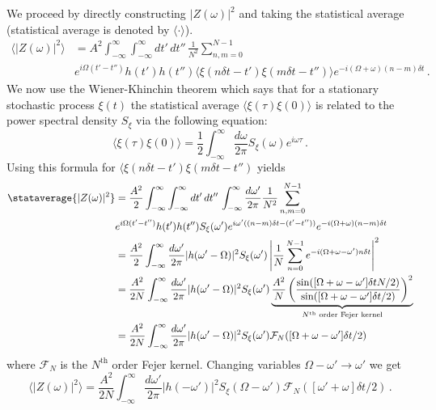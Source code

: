 We proceed by directly constructing $|Z(\omega)|^2$ and taking the statistical average (statistical average is denoted by $\langle \cdot \rangle$).
\begin{align}
\langle \left| Z(\omega) \right| ^2 \rangle
&= A^2 \int_{-\infty}^\infty \int_{-\infty}^\infty dt' \, dt'' \, \frac{1}{N^2} \sum_{n,m=0}^{N-1} \nonumber \\
& e^{i\Omega (t' - t'')} h(t') h(t'') \langle \xi(n\delta t - t') \xi(m\delta t - t'') \rangle e^{-i(\Omega + \omega)(n - m)\delta t} \, .
\end{align}
We now use the Wiener-Khinchin theorem which says that for a stationary stochastic process $\xi(t)$ the statistical average $\langle \xi(\tau) \xi(0) \rangle$  is related to the power spectral density $S_\xi$ via the following equation:
\begin{equation}
\langle \xi(\tau) \xi(0) \rangle = \frac{1}{2}\int_{-\infty}^\infty \frac{d\omega}{2\pi} S_\xi(\omega) e^{i \omega \tau} \, .
\end{equation}
Using this formula for $\langle \xi(n\delta t - t') \xi(m\delta t - t'')$ yields
\begin{align}
\stataverage{|Z(\omega)|^2}
&= \frac{A^2}{2} \int_{-\infty}^\infty \int_{-\infty}^\infty dt' \, dt'' \, \int_{-\infty}^\infty \frac{d\omega'}{2\pi}\frac{1}{N^2} \sum_{n,m=0}^{N-1} \nonumber \\
& e^{i\Omega (t' - t'')} h(t') h(t'') S_\xi(\omega') e^{i\omega' ((n-m)\delta t - (t' - t''))} e^{-i(\Omega + \omega)(n - m)\delta t} \\
&= \frac{A^2}{2} \int_{-\infty}^\infty \frac{d\omega'}{2\pi} |h(\omega' - \Omega)|^2 S_\xi(\omega') \left| \frac{1}{N} \sum_{n=0}^{N-1} e^{-i(\Omega + \omega - \omega') n \delta t} \right|^2 \\
&= \frac{A^2}{2N} \int_{-\infty}^\infty \frac{d\omega'}{2\pi} |h(\omega' - \Omega)|^2 S_\xi(\omega') \underbrace{
\frac{A^2}{N} \left( \frac{\sin([\Omega + \omega - \omega'] \delta t N / 2)}{\sin([\Omega + \omega - \omega']\delta t / 2)} \right)^2
}_{N^{\text{th}}\text{ order Fejer kernel}} \\
&= \frac{A^2}{2N} \int_{-\infty}^\infty \frac{d\omega'}{2\pi} |h(\omega' - \Omega)|^2 S_\xi(\omega') \mathcal{F}_N([\Omega + \omega - \omega'] \delta t / 2) \\
\end{align}
where $\mathcal{F}_N$ is the $N^{\text{th}}$ order Fejer kernel.
Changing variables $\Omega - \omega' \rightarrow \omega'$ we get
\begin{equation}
\langle |Z(\omega)|^2 \rangle =
\frac{A^2}{2N} \int_{-\infty}^\infty \frac{d\omega'}{2\pi} |h(-\omega')|^2 S_\xi(\Omega - \omega') \mathcal{F}_N([\omega' + \omega]\delta t / 2) \, .
\end{equation}
